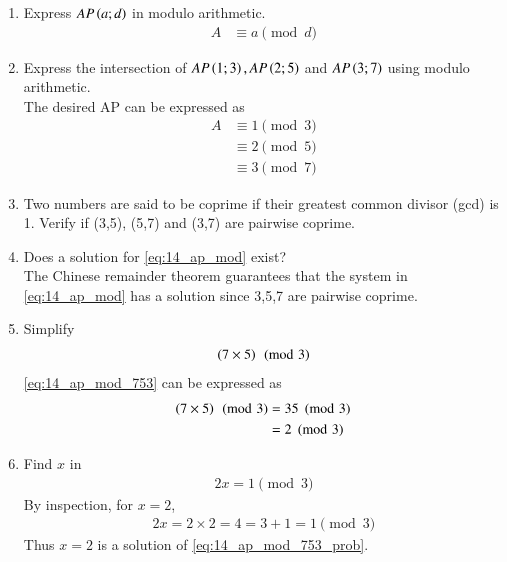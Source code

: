 \begin{enumerate}[label=\arabic*.,ref=\thesubsection.\theenumi]
\begin{enumerate}[label=\arabic*.,ref=\thesubsection.\theenumi]
\item Express $AP\left(a;d\right)$ in modulo arithmetic.
\\
\solution 
\begin{align}
\label{eq:14_ap_mod_def}
A &\equiv a\pmod{d}
\end{align}
\item Express the intersection of $AP\left(1;3\right), AP\left(2;5\right)$ and $AP\left(3;7\right)$  using modulo arithmetic.
\\
\solution The desired AP can be expressed as
\begin{align}
\label{eq:14_ap_mod}
A &\equiv 1\pmod{3}
\\
& \equiv 2\pmod {5}
\\
&\equiv 3\pmod{7}
\end{align}
%
\item Two numbers are said to be coprime if their greatest common divisor (gcd) is 1. Verify if (3,5), (5,7) and (3,7) are pairwise coprime.
\item Does a solution for \eqref{eq:14_ap_mod} exist?
\\
\solution  The Chinese remainder theorem guarantees that the system in \eqref{eq:14_ap_mod} has a solution since 3,5,7 are pairwise coprime.
% 
\item Simplify 
\begin{align}
\label{eq:14_ap_mod_753}
\left(7\times 5\right)\pmod{3}
\end{align}
%
\solution \eqref{eq:14_ap_mod_753} can be expressed as
%
\begin{align}
\label{eq:14_ap_mod_753_sol}
\left(7\times 5\right)\pmod{3} &= 35\pmod{3} 
\nonumber \\
&=2\pmod{3}
\end{align}

\item Find $x$ in 
%
\begin{align}
\label{eq:14_ap_mod_753_prob}
2x =1\pmod{3}
\end{align}
%
%
\solution By inspection, for $x = 2$, 
\begin{align}
2x = 2\times 2 = 4 = 3+1 =1\pmod{3}
\end{align}
%
Thus $x = 2$ is a solution of \eqref{eq:14_ap_mod_753_prob}. 


\end{enumerate}
\end{enumerate}
